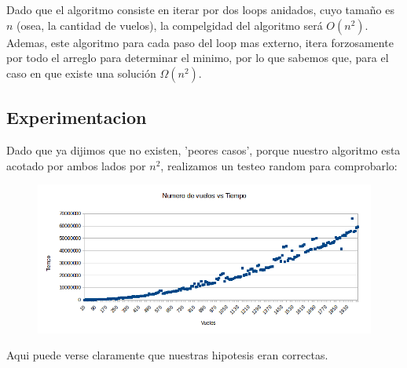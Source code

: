 Dado que el algoritmo consiste en iterar por dos loops anidados, cuyo tamaño es $n$ (osea, la cantidad de vuelos), la compelgidad del algoritmo será $O(n^2)$.
\\
Ademas, este algoritmo para cada paso del loop mas externo, itera forzosamente por todo el arreglo para determinar el minimo, por lo que sabemos que, para el caso en que existe una solución $\Omega (n^2)$.

\newpage

\subsection{Experimentacion}

Dado que ya dijimos que no existen, 'peores casos', porque nuestro algoritmo esta acotado por ambos lados por $n^2$, realizamos un testeo random para comprobarlo:

\begin{figure}[h!]
  \begin{center}
	\includegraphics[scale=0.5]{Ej1/testingnvst.png}
	\label{nombreparareferenciar}
  \end{center}
\end{figure}

Aqui puede verse claramente que nuestras hipotesis eran correctas.